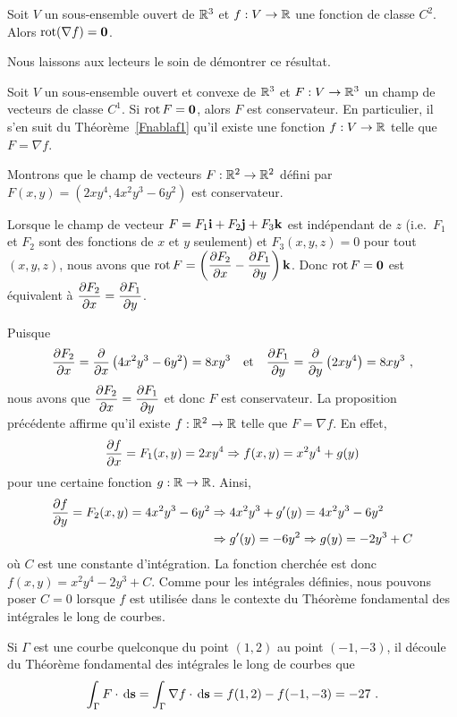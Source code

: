 {\begin{prop}
Soit $V$ un sous-ensemble ouvert de $\RR^3$ et $f:V\to \RR$ une
fonction de classe $C^2$.  Alors
$\curl(\nabla f) = \VEC{0}$.
\end{prop}

Nous laissons aux lecteurs le soin de démontrer ce résultat.

\begin{prop}
Soit $V$ un sous-ensemble ouvert et convexe de $\RR^3$ et
$F:V\to \RR^3$ un champ de vecteurs de classe $C^1$.  Si
$\curl F = \VEC{0}$, alors $F$ est conservateur.  En particulier, il
s'en suit du Théorème~\ref{Fnablaf1} qu'il existe une fonction
$f:V\to \RR$ telle que $F = \nabla f$.
\label{rotFzero}
\end{prop}

\begin{egg}
Montrons que le champ de vecteurs $F:\RR^2 \to \RR^2$ défini par
$F(x,y) = \left( 2 x y^4 , 4 x^2y^3 - 6 y^2\right)$ est conservateur.

Lorsque le champ de vecteur $F = F_1 \ii + F_2 \jj + F_3 \kk$ est
indépendant de $z$ (i.e.\ $F_1$ et $F_2$ sont des fonctions de $x$ et $y$
seulement) et $F_3(x,y,z) = 0$ pour tout $(x,y,z)$, nous avons que
$\DS \curl F =
\left( \pdydx{F_2}{x} - \pdydx{F_1}{y}\right)\kk$.
Donc $\curl F = \VEC{0}$ est équivalent à
$\DS \pdydx{F_2}{x} = \pdydx{F_1}{y}$.

Puisque
\[
\pdydx{F_2}{x} = \pdfdx{\left(4x^2 y^3 - 6 y^2\right)}{x} = 8x y^3
\quad \text{et} \quad
\pdydx{F_1}{y} = \pdfdx{\left(2 x y^4\right)}{y} = 8x y^3 \ ,
\]
nous avons que $\DS \pdydx{F_2}{x} = \pdydx{F_1}{y}$ et donc
$F$ est conservateur.  La proposition précédente affirme qu'il existe
$f:\RR^2 \to \RR$ telle que $F = \nabla f$.  En effet,
\[
  \pdydx{f}{x} = F_1(x,y) = 2 x y^4 \Rightarrow f(x,y) = x^2 y^4 + g(y)
\]
pour une certaine fonction $g:\RR \to \RR$.  Ainsi,
\begin{align*}
\pdydx{f}{y} = F_2(x,y) = 4 x^2y^3 - 6 y^2 &\Rightarrow
4x^2y^3 + g'(y) = 4 x^2y^3 - 6 y^2 \\
& \Rightarrow  g'(y) = -6 y^2 \Rightarrow g(y) = -2 y^3 + C
\end{align*}
où $C$ est une constante d'intégration.  La fonction cherchée est donc
$f(x,y) = x^2 y^4 - 2 y^3 + C$.  Comme pour les intégrales
définies, nous pouvons poser $C=0$ lorsque $f$ est
utilisée dans le contexte du Théorème fondamental des intégrales le long
de courbes.

Si $\Gamma$ est une courbe quelconque du point $(1,2)$ au point
$(-1,-3)$, il découle du Théorème fondamental des intégrales le
long de courbes que
\[
  \int_{\Gamma} F \cdot \dx{\VEC{s}}
  = \int_{\Gamma} \nabla f \cdot \dx{\VEC{s}}
  = f(1,2)-f(-1,-3) =  -27 \ .
\]
\label{rotFzeroD2}
\end{egg}

}
